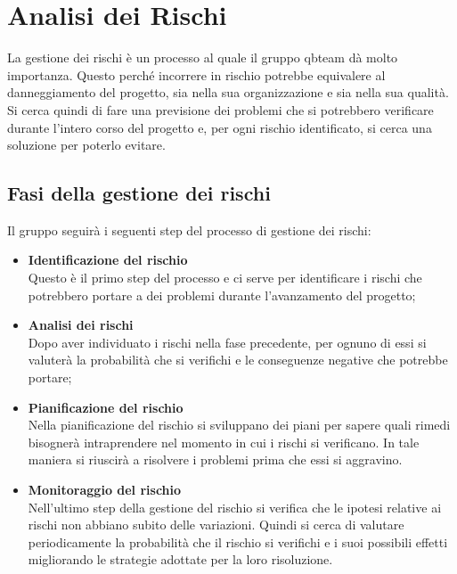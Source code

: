 \section{Analisi dei Rischi}
La gestione dei rischi è un processo al quale il gruppo qbteam dà molto importanza. Questo perché incorrere in rischio potrebbe equivalere al danneggiamento del progetto, sia nella sua organizzazione e sia nella sua qualità.
Si cerca quindi di fare una previsione dei problemi che si potrebbero verificare durante l'intero corso del progetto e, per ogni rischio identificato, si cerca una soluzione per poterlo evitare.

\subsection{Fasi della gestione dei rischi}
Il gruppo seguirà i seguenti step del processo di gestione dei rischi:
\begin{itemize}
	\item \textbf{Identificazione del rischio}
	\\ Questo è il primo step del processo e ci serve per identificare i rischi che potrebbero portare a dei problemi durante l'avanzamento del progetto; 
\end{itemize}
\begin{itemize}
	\item \textbf{Analisi dei rischi}
	\\ Dopo aver individuato i rischi nella fase precedente, per ognuno di essi si valuterà la probabilità che si verifichi e le conseguenze negative che potrebbe portare;
\end{itemize}
\begin{itemize}
	\item \textbf{Pianificazione del rischio}
	\\ Nella pianificazione del rischio si sviluppano dei piani per sapere quali rimedi bisognerà intraprendere nel momento in cui i rischi si verificano. In tale maniera si riuscirà a risolvere i problemi prima che essi si aggravino.
\end{itemize}
\begin{itemize}
	\item \textbf{Monitoraggio del rischio} 
	\\ Nell'ultimo step della gestione del rischio si verifica che le ipotesi relative ai rischi non abbiano subito delle variazioni. Quindi si cerca di valutare periodicamente la probabilità che il rischio si verifichi e i suoi possibili effetti migliorando le strategie adottate per la loro risoluzione.
\end{itemize}


